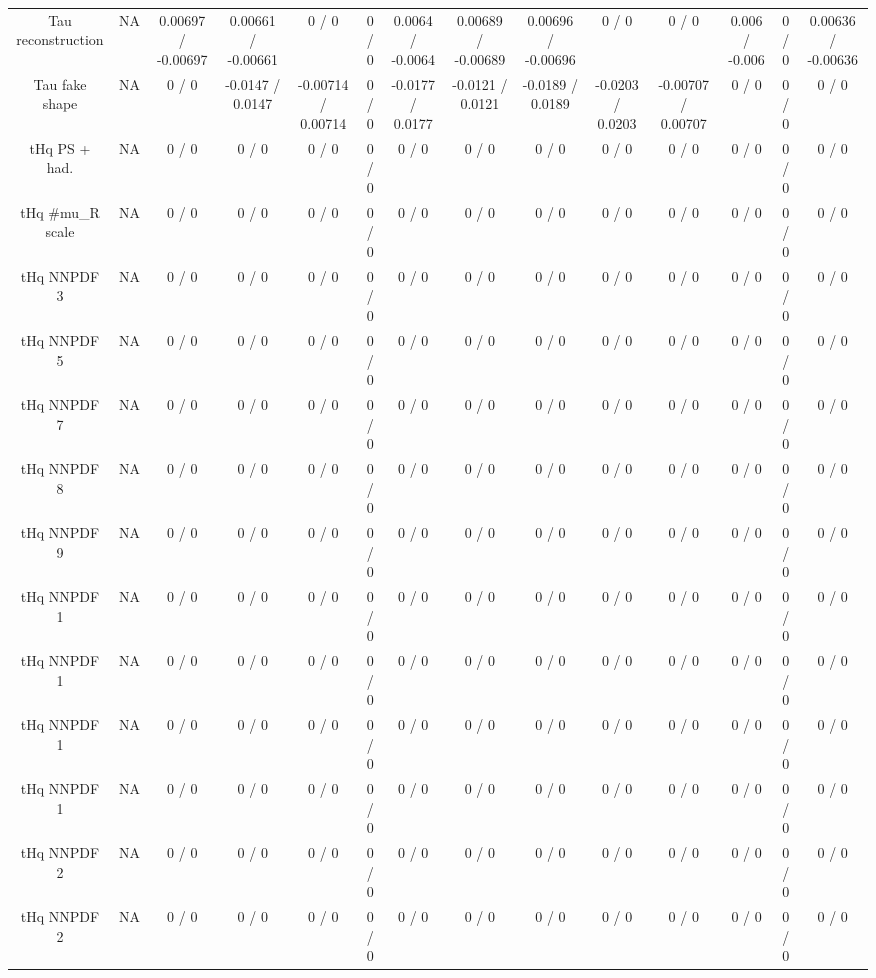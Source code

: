\documentclass[10pt]{article}
\begin{document}
\begin{table}[htbp]
\begin{center}
\begin{tabular}{|c|c|c|c|c|c|c|c|c|c|c|c|c|c|}
  Tau reconstruction &    NA    & 0.00697 / -0.00697 & 0.00661 / -0.00661 & 0 / 0 & 0 / 0 & 0.0064 / -0.0064 & 0.00689 / -0.00689 & 0.00696 / -0.00696 & 0 / 0 & 0 / 0 & 0.006 / -0.006 & 0 / 0 & 0.00636 / -0.00636 \\ 
  Tau fake shape &    NA    & 0 / 0 & -0.0147 / 0.0147 & -0.00714 / 0.00714 & 0 / 0 & -0.0177 / 0.0177 & -0.0121 / 0.0121 & -0.0189 / 0.0189 & -0.0203 / 0.0203 & -0.00707 / 0.00707 & 0 / 0 & 0 / 0 & 0 / 0 \\ 
  tHq PS + had. &    NA    & 0 / 0 & 0 / 0 & 0 / 0 & 0 / 0 & 0 / 0 & 0 / 0 & 0 / 0 & 0 / 0 & 0 / 0 & 0 / 0 & 0 / 0 & 0 / 0 \\ 
  tHq #mu_{R} scale &    NA    & 0 / 0 & 0 / 0 & 0 / 0 & 0 / 0 & 0 / 0 & 0 / 0 & 0 / 0 & 0 / 0 & 0 / 0 & 0 / 0 & 0 / 0 & 0 / 0 \\ 
  tHq NNPDF 3 &    NA    & 0 / 0 & 0 / 0 & 0 / 0 & 0 / 0 & 0 / 0 & 0 / 0 & 0 / 0 & 0 / 0 & 0 / 0 & 0 / 0 & 0 / 0 & 0 / 0 \\ 
  tHq NNPDF 5 &    NA    & 0 / 0 & 0 / 0 & 0 / 0 & 0 / 0 & 0 / 0 & 0 / 0 & 0 / 0 & 0 / 0 & 0 / 0 & 0 / 0 & 0 / 0 & 0 / 0 \\ 
  tHq NNPDF 7 &    NA    & 0 / 0 & 0 / 0 & 0 / 0 & 0 / 0 & 0 / 0 & 0 / 0 & 0 / 0 & 0 / 0 & 0 / 0 & 0 / 0 & 0 / 0 & 0 / 0 \\ 
  tHq NNPDF 8 &    NA    & 0 / 0 & 0 / 0 & 0 / 0 & 0 / 0 & 0 / 0 & 0 / 0 & 0 / 0 & 0 / 0 & 0 / 0 & 0 / 0 & 0 / 0 & 0 / 0 \\ 
  tHq NNPDF 9 &    NA    & 0 / 0 & 0 / 0 & 0 / 0 & 0 / 0 & 0 / 0 & 0 / 0 & 0 / 0 & 0 / 0 & 0 / 0 & 0 / 0 & 0 / 0 & 0 / 0 \\ 
  tHq NNPDF 1 &    NA    & 0 / 0 & 0 / 0 & 0 / 0 & 0 / 0 & 0 / 0 & 0 / 0 & 0 / 0 & 0 / 0 & 0 / 0 & 0 / 0 & 0 / 0 & 0 / 0 \\ 
  tHq NNPDF 1 &    NA    & 0 / 0 & 0 / 0 & 0 / 0 & 0 / 0 & 0 / 0 & 0 / 0 & 0 / 0 & 0 / 0 & 0 / 0 & 0 / 0 & 0 / 0 & 0 / 0 \\ 
  tHq NNPDF 1 &    NA    & 0 / 0 & 0 / 0 & 0 / 0 & 0 / 0 & 0 / 0 & 0 / 0 & 0 / 0 & 0 / 0 & 0 / 0 & 0 / 0 & 0 / 0 & 0 / 0 \\ 
  tHq NNPDF 1 &    NA    & 0 / 0 & 0 / 0 & 0 / 0 & 0 / 0 & 0 / 0 & 0 / 0 & 0 / 0 & 0 / 0 & 0 / 0 & 0 / 0 & 0 / 0 & 0 / 0 \\ 
  tHq NNPDF 2 &    NA    & 0 / 0 & 0 / 0 & 0 / 0 & 0 / 0 & 0 / 0 & 0 / 0 & 0 / 0 & 0 / 0 & 0 / 0 & 0 / 0 & 0 / 0 & 0 / 0 \\ 
  tHq NNPDF 2 &    NA    & 0 / 0 & 0 / 0 & 0 / 0 & 0 / 0 & 0 / 0 & 0 / 0 & 0 / 0 & 0 / 0 & 0 / 0 & 0 / 0 & 0 / 0 & 0 / 0 \\ 

\end{tabular}
\end{center}
\end{table}
\end{document}
